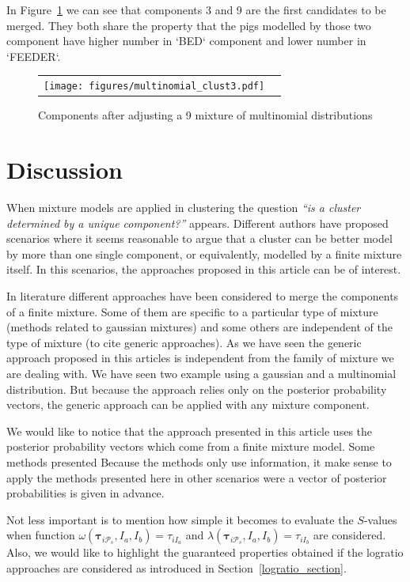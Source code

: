 \documentclass[10pt, a4paper]{article}
\newcommand{\m}[1]{\boldsymbol{#1}}
\begin{document}
\begin{spacing}{1.9}
In Figure~\ref{multinomial_clust3} we can see that components 3 and 9 are the first candidates to be merged. They both share the property that the pigs modelled by those two component have higher number in `BED` component and lower number in `FEEDER`.

\begin{figure}[t]
\begin{center}
\begin{tabular}{cc}
  \texttt{[image: figures/multinomial\_clust3.pdf]} \\
 \end{tabular}
 \caption{Components after adjusting a 9 mixture of multinomial distributions}\label{multinomial_clust3}
\end{center}
\end{figure}

\section{Discussion}

When mixture models are applied in clustering the question \textit{``is a cluster determined by a unique component?''} appears. Different authors have proposed scenarios where it seems reasonable to argue that a cluster can be better model by more than one single component, or equivalently, modelled by a finite mixture itself. In this scenarios, the approaches proposed in this article can be of interest.

In literature different approaches have been considered to merge the components of a finite mixture. Some of them are specific to a particular type of mixture (methods related to gaussian mixtures) and some others are independent of the type of mixture (to cite generic approaches). As we have seen the generic approach proposed in this articles is independent from the family of mixture we are dealing with. We have seen two example using a gaussian and a multinomial distribution. But because the approach relies only on the posterior probability vectors, the generic approach can be applied with any mixture component.

We would like to notice that the approach presented in this article uses the posterior probability vectors which come from a finite mixture model. Some methods presented Because the methods only use information, it make sense to apply the methods presented here in other scenarios were a vector of posterior probabilities is given in advance.

Not less important is to mention how simple it becomes to evaluate the $S$-values when function $\omega(\m\tau_{i \mathcal{P}_s},  I_a,  I_b) = \tau_{iI_a}$ and $\lambda(\m\tau_{i \mathcal{P}_s},  I_a,  I_b) = \tau_{iI_b}$ are considered. Also, we would like to highlight the guaranteed properties obtained if the logratio approaches are considered as introduced in Section~\ref{logratio_section}.


\end{spacing}
\end{document}
